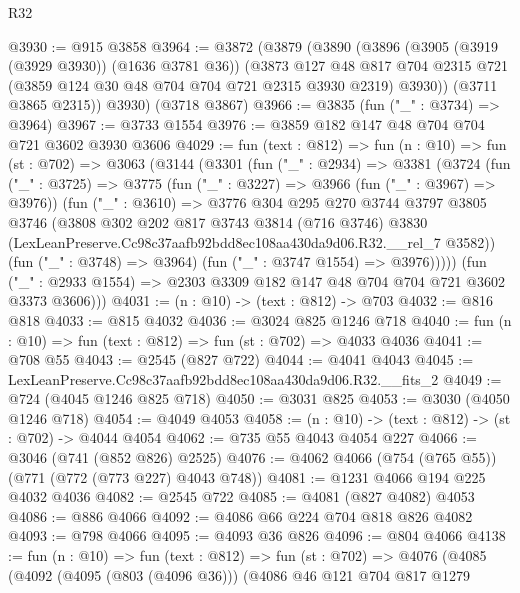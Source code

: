 \begin{lexlean}{R32}
\begin{coremodule}
@3930 := @915 @3858
@3964 := @3872
    (@3879
      (@3890
        (@3896
          (@3905 (@3919 (@3929 @3930)) (@1636 @3781 @36))
          (@3873
            @127
            @48
            @817
            @704
            @2315
            @721
            (@3859 @124 @30 @48 @704 @704 @721 @2315 @3930 @2319)
            @3930))
        (@3711 @3865 @2315))
      @3930)
    (@3718 @3867)
@3966 := @3835 (fun ("_" : @3734) => @3964)
@3967 := @3733 @1554
@3976 := @3859 @182 @147 @48 @704 @704 @721 @3602 @3930 @3606
@4029 := fun (text : @812) =>
  fun (n : @10) =>
  fun (st : @702) =>
  @3063
    (@3144
      (@3301
        (fun ("_" : @2934) =>
        @3381
          (@3724
            (fun ("_" : @3725) =>
            @3775
              (fun ("_" : @3227) => @3966 (fun ("_" : @3967) => @3976))
              (fun ("_" : @3610) =>
              @3776
                @304
                @295
                @270
                @3744
                @3797
                @3805
                @3746
                (@3808
                  @302
                  @202
                  @817
                  @3743
                  @3814
                  (@716 @3746)
                  @3830
                  (LexLeanPreserve.Cc98c37aafb92bdd8ec108aa430da9d06.R32.__rel_7 @3582))
                (fun ("_" : @3748) => @3964)
                (fun ("_" : @3747 @1554) => @3976)))))
        (fun ("_" : @2933 @1554) => @2303 @3309 @182 @147 @48 @704 @704 @721 @3602 @3373 @3606)))
@4031 := (n : @10) -> (text : @812) -> @703
@4032 := @816 @818
@4033 := @815 @4032
@4036 := @3024 @825 @1246 @718
@4040 := fun (n : @10) => fun (text : @812) => fun (st : @702) => @4033 @4036
@4041 := @708 @55
@4043 := @2545 (@827 @722)
@4044 := @4041 @4043
@4045 := LexLeanPreserve.Cc98c37aafb92bdd8ec108aa430da9d06.R32.__fits_2
@4049 := @724 (@4045 @1246 @825 @718)
@4050 := @3031 @825
@4053 := @3030 (@4050 @1246 @718)
@4054 := @4049 @4053
@4058 := (n : @10) -> (text : @812) -> (st : @702) -> @4044 @4054
@4062 := @735 @55 @4043 @4054 @227
@4066 := @3046 (@741 (@852 @826) @2525)
@4076 := @4062 @4066 (@754 (@765 @55)) (@771 (@772 (@773 @227) @4043 @748))
@4081 := @1231 @4066 @194 @225 @4032 @4036
@4082 := @2545 @722
@4085 := @4081 (@827 @4082) @4053
@4086 := @886 @4066
@4092 := @4086 @66 @224 @704 @818 @826 @4082
@4093 := @798 @4066
@4095 := @4093 @36 @826
@4096 := @804 @4066
@4138 := fun (n : @10) =>
  fun (text : @812) =>
  fun (st : @702) =>
  @4076
    (@4085
      (@4092
        (@4095 (@803 (@4096 @36)))
        (@4086
          @46
          @121
          @704
          @817
          @1279

\end{coremodule}
\end{lexlean}
